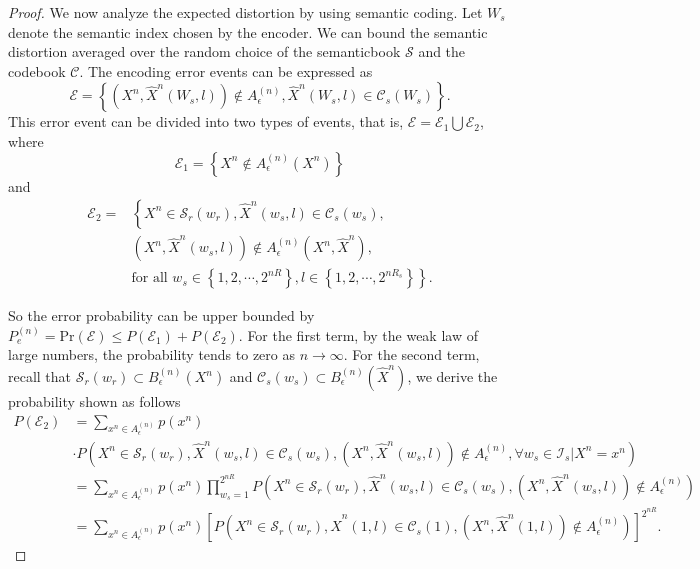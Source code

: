 \documentclass[12pt, draftclsnofoot,onecolumn]{IEEEtran}
\begin{document}
\begin{proof}
We now analyze the expected distortion by using semantic coding. Let $W_s$ denote the semantic index chosen by the encoder. We can bound the semantic distortion averaged over the random choice of the semanticbook $\mathcal{S}$ and the codebook $\mathcal{C}$. The encoding error events can be expressed as
\begin{equation}
\mathcal{E}=\left\{\left(X^n,\hat{X}^n(W_s,l)\right)\notin A_{\epsilon}^{(n)}, \hat{X}^n(W_s,l)\in \mathcal{C}_s(W_s)\right\}.
\end{equation}
This error event can be divided into two types of events, that is, $\mathcal{E}=\mathcal{E}_1\bigcup\mathcal{E}_2$, where
\begin{equation}
\mathcal{E}_1=\left\{X^n \notin A_{\epsilon}^{(n)}(X^n)\right\}
\end{equation}
and
\begin{equation}
\begin{aligned}
\mathcal{E}_2=&\left\{X^n\in \mathcal{S}_r(w_r), \hat{X}^n(w_s,l)\in \mathcal{C}_s(w_s),\right.\\
                        & \left(X^n, \hat{X}^n(w_s,l)\right)\notin A_{\epsilon}^{(n)}(X^n,\hat{X}^n),\\
                        &\left. \text{for all } w_s\in \left\{1,2,\cdots,2^{nR}\right\}, l\in \left\{1,2,\cdots,2^{nR_s}\right\}\right\}.
\end{aligned}
\end{equation}

So the error probability can be upper bounded by $P_e^{(n)}=\text{Pr}(\mathcal{E})\leq P(\mathcal{E}_1)+P(\mathcal{E}_2)$.
For the first term, by the weak law of large numbers, the probability tends to zero as $n\to\infty$. For the second term, recall that $\mathcal{S}_r(w_r)\subset B_{\epsilon}^{(n)}(X^n)$ and $\mathcal{C}_s(w_s)\subset B_{\epsilon}^{(n)}(\hat{X}^n)$, we derive the probability shown as follows%
\begin{equation}
\begin{aligned}
P(\mathcal{E}_2)&=\sum_{x^n\in A_{\epsilon}^{(n)}} p(x^n) \\
&\cdot P\left(X^n\in \mathcal{S}_r(w_r), \hat{X}^n(w_s,l)\in \mathcal{C}_s(w_s), (X^n, \hat{X}^n(w_s,l))\notin A_{\epsilon}^{(n)}, \forall w_s\in \mathcal{I}_s|X^n=x^n\right)\\
&=\sum_{x^n\in A_{\epsilon}^{(n)}} p(x^n) \prod_{w_s=1}^{2^{nR}} P\left(X^n\in \mathcal{S}_r(w_r), \hat{X}^n(w_s,l)\in \mathcal{C}_s(w_s),(X^n, \hat{X}^n(w_s,l))\notin A_{\epsilon}^{(n)}\right)\\
&=\sum_{x^n\in A_{\epsilon}^{(n)}} p(x^n) \left[P\left(X^n\in \mathcal{S}_r(w_r), \hat{X}^n(1,l)\in \mathcal{C}_s(1),(X^n, \hat{X}^n(1,l))\notin A_{\epsilon}^{(n)}\right)\right]^{2^{nR}}.
\end{aligned}
\end{equation}



\end{proof}
\end{document}
